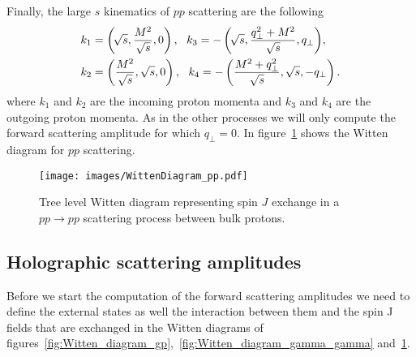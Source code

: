 \documentclass[a4paper,12pt]{article}
\begin{document}
Finally, the large $s$ kinematics of $pp$ scattering are the following
\begin{align}
\label{eq:pp_kinematics}
&k_1=\left(\!\sqrt{s},\frac{M^2}{\sqrt{s}} ,0\right),\  \ k_3=-\left(\!\sqrt{s},\frac{ q_\perp^2 +M^2}{\sqrt{s}} , q_\perp \right)\!,\\
&k_2=\left(\frac{M^2}{\sqrt{s}},\sqrt{s} ,0\right),\  \ k_4=-\left(\frac{M^2+ q_\perp^2}{\sqrt{s}},\sqrt{s} ,-q_\perp \right).\notag
\end{align}
where $k_1$ and $k_2$ are the incoming proton momenta and $k_3$ and $k_4$ are the outgoing proton momenta. As in the other processes we will only compute the forward scattering amplitude for which $q_\perp = 0$. In figure~\ref{fig:Witten_diagram_pp} shows the Witten diagram for $pp$ scattering. 
\begin{figure}[!h]
  \center
  \texttt{[image: images/WittenDiagram\_pp.pdf]} 
  \caption{Tree level Witten diagram representing spin $J$    exchange in a $pp \to pp$ scattering process between bulk protons.}
  \label{fig:Witten_diagram_pp}
\end{figure}

\subsection{Holographic scattering amplitudes}
Before we start the computation of the forward scattering amplitudes we need to define the external states as well the interaction between them and the spin J fields that are exchanged in the Witten diagrams of figures~\ref{fig:Witten_diagram_gp},~\ref{fig:Witten_diagram_gamma_gamma} and~\ref{fig:Witten_diagram_pp}.
\end{document}
